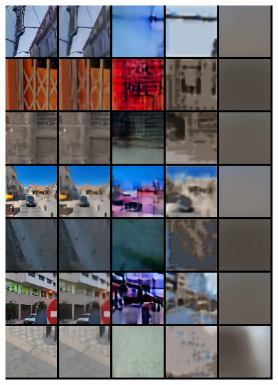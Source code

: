\begin{appendices}
\begin{figure}
    \includegraphics[width=0.92\textwidth]{figures/ptz/test_stacked_3}
\end{figure}
\begin{figure}
    \centering

\end{figure}
\end{appendices}
